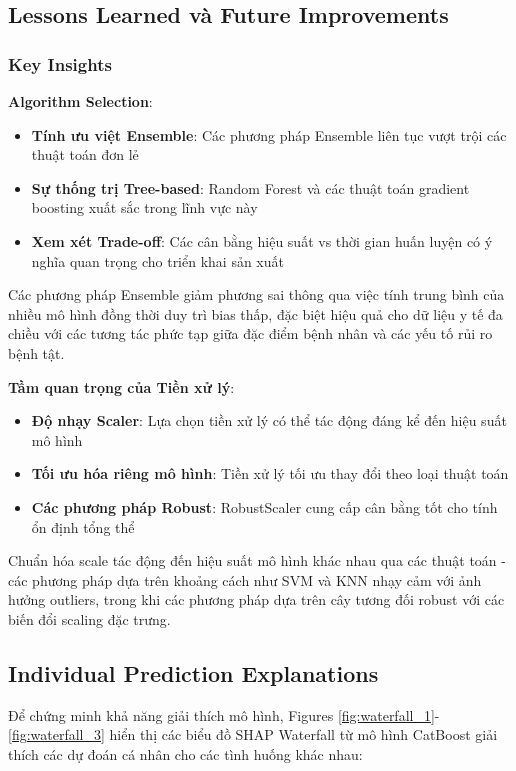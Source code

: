 \subsection{Lessons Learned và Future Improvements}

\subsubsection{Key Insights}

\textbf{Algorithm Selection}:
\begin{itemize}
    \item \textbf{Tính ưu việt Ensemble}: Các phương pháp Ensemble liên tục vượt trội các thuật toán đơn lẻ
    \item \textbf{Sự thống trị Tree-based}: Random Forest và các thuật toán gradient boosting xuất sắc trong lĩnh vực này
    \item \textbf{Xem xét Trade-off}: Các cân bằng hiệu suất vs thời gian huấn luyện có ý nghĩa quan trọng cho triển khai sản xuất
\end{itemize}
Các phương pháp Ensemble giảm phương sai thông qua việc tính trung bình của nhiều mô hình đồng thời duy trì bias thấp, đặc biệt hiệu quả cho dữ liệu y tế đa chiều với các tương tác phức tạp giữa đặc điểm bệnh nhân và các yếu tố rủi ro bệnh tật.

\textbf{Tầm quan trọng của Tiền xử lý}:
\begin{itemize}
    \item \textbf{Độ nhạy Scaler}: Lựa chọn tiền xử lý có thể tác động đáng kể đến hiệu suất mô hình
    \item \textbf{Tối ưu hóa riêng mô hình}: Tiền xử lý tối ưu thay đổi theo loại thuật toán
    \item \textbf{Các phương pháp Robust}: RobustScaler cung cấp cân bằng tốt cho tính ổn định tổng thể
\end{itemize}
Chuẩn hóa scale tác động đến hiệu suất mô hình khác nhau qua các thuật toán - các phương pháp dựa trên khoảng cách như SVM và KNN nhạy cảm với ảnh hưởng outliers, trong khi các phương pháp dựa trên cây tương đối robust với các biến đổi scaling đặc trưng.

\subsection{Individual Prediction Explanations}

Để chứng minh khả năng giải thích mô hình, Figures \ref{fig:waterfall_1}-\ref{fig:waterfall_3} hiển thị các biểu đồ SHAP Waterfall từ mô hình CatBoost giải thích các dự đoán cá nhân cho các tình huống khác nhau:

